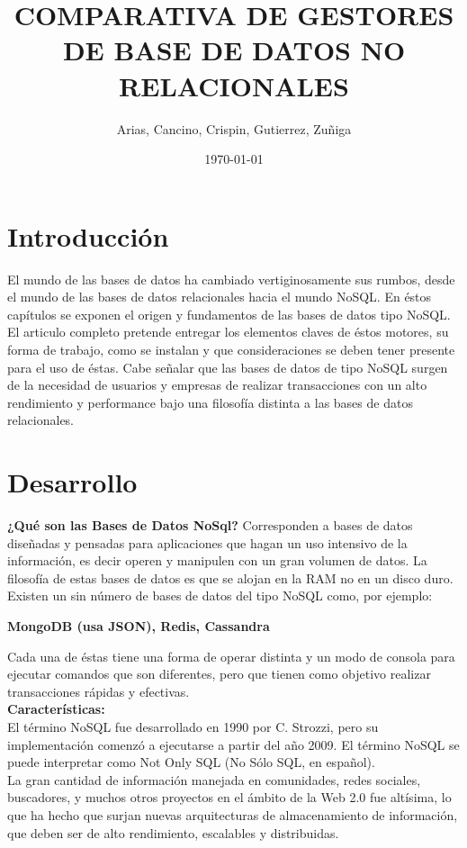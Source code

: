 \documentclass[twoside,twocolumn]{article}
\title{COMPARATIVA DE GESTORES DE BASE DE DATOS NO RELACIONALES} %
\author{Arias, Cancino, Crispin, Gutierrez, Zuñiga}
\date{\today} %
\begin{document}
\maketitle
\vspace*{5 in}
\section{Introducción}
El mundo de las bases de datos ha cambiado vertiginosamente sus rumbos, desde el mundo de las bases de datos relacionales hacia el mundo NoSQL. 
En éstos capítulos se exponen el origen y fundamentos de las bases de datos tipo NoSQL.
El articulo completo pretende entregar los elementos claves de éstos motores, su forma de trabajo, como se instalan y que consideraciones se deben tener presente para el uso de éstas. Cabe señalar que las bases de datos de tipo NoSQL surgen de la necesidad de usuarios y empresas de realizar transacciones con un alto rendimiento y performance bajo una filosofía distinta a las bases de datos relacionales.
\\
\section{Desarrollo}
\textbf{¿Qué son las Bases de Datos NoSql?}
Corresponden a bases de datos diseñadas y pensadas para aplicaciones que hagan un uso intensivo de la información, es decir operen y manipulen con un gran volumen de datos.
La filosofía de estas bases de datos es que se alojan en la RAM no en un disco duro.
\\
Existen un sin número de bases de datos del tipo NoSQL como, por ejemplo: \\
\begin{center}
    \textbf{MongoDB (usa JSON), Redis, Cassandra}\\
\end{center}
Cada una de éstas tiene una forma de operar distinta y un modo de consola para ejecutar comandos que son diferentes, pero que tienen como objetivo realizar transacciones rápidas y efectivas.\\

\textbf{Características:}\\
El término NoSQL fue desarrollado en 1990 por C. Strozzi, pero su implementación comenzó a ejecutarse a partir del año 2009. El término NoSQL se puede interpretar como Not Only SQL (No Sólo SQL, en español).
\\
La gran cantidad de información manejada en comunidades, redes sociales, buscadores, y muchos otros proyectos en el ámbito de la Web 2.0 fue altísima, lo que ha hecho que surjan nuevas arquitecturas de almacenamiento de información, que deben ser de alto rendimiento, escalables y distribuidas.
\\
\end{document}
